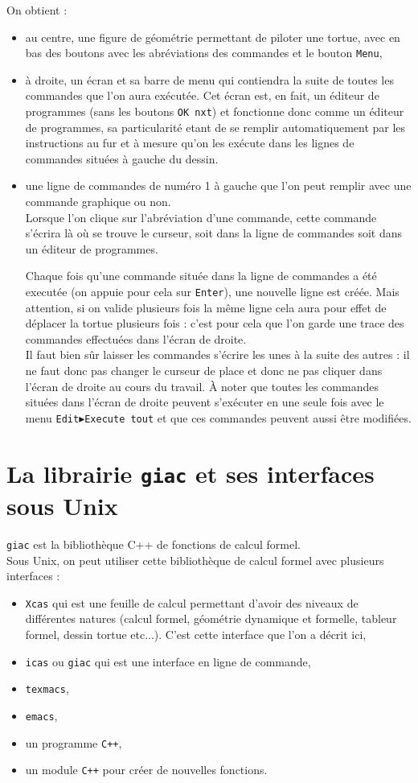 \documentclass[a4paper,11pt]{article}
\begin{document}
On obtient :
\begin{itemize}
\item au centre, une figure de g\'eom\'etrie permettant de piloter une tortue,
avec en bas des boutons avec les abr\'eviations des commandes et le 
bouton {\tt Menu}, 
\item \`a droite, un \'ecran et sa barre de menu qui contiendra la suite de 
toutes les commandes que l'on aura ex\'ecut\'ee. Cet \'ecran est, en fait, 
un \'editeur de programmes (sans les boutons {\tt OK nxt}) et fonctionne donc 
comme un \'editeur de programmes, sa particularit\'e etant de se remplir 
automatiquement par les instructions au fur et \`a mesure qu'on les ex\'ecute
dans les lignes de commandes situ\'ees \`a gauche du dessin.
\item une ligne de commandes de num\'ero 1 \`a gauche que l'on peut remplir
 avec une commande graphique ou non.\\
 Lorsque l'on clique sur l'abr\'eviation d'une commande, cette commande
s'\'ecrira l\`a o\`u se trouve le curseur, soit dans la ligne de commandes soit
dans un \'editeur de programmes. 

Chaque fois qu'une commande situ\'ee dans la ligne de commandes a \'et\'e 
execut\'ee (on appuie pour cela sur {\tt Enter}), une nouvelle ligne est 
cr\'e\'ee. Mais attention, si on valide plusieurs fois la m\^eme ligne cela 
aura pour effet de d\'eplacer la tortue plusieurs fois : c'est pour cela que 
l'on garde une trace des commandes effectu\'ees dans l'\'ecran de droite.\\
Il faut bien s\^ur laisser les commandes s'\'ecrire les unes \`a la suite des 
autres : il ne faut donc pas changer le curseur de place et donc ne pas cliquer
dans l'\'ecran de droite au cours du travail.
\`A noter que toutes les commandes situ\'ees dans l'\'ecran de droite peuvent
s'ex\'ecuter en une seule fois avec le menu 
{\tt Edit$\blacktriangleright$Execute tout} et que ces commandes peuvent aussi
\^etre modifi\'ees.
\end{itemize}
\section{La librairie {\tt giac} et ses interfaces sous Unix}
{\tt giac} est la biblioth\`eque C++ de fonctions de calcul formel.\\
Sous Unix, on peut utiliser cette biblioth\`eque de calcul formel avec 
plusieurs interfaces :
\begin{itemize}
\item 
{\tt Xcas} qui est une feuille de calcul permettant d'avoir des niveaux de 
diff\'erentes natures (calcul formel, g\'eom\'etrie dynamique et formelle, 
tableur formel, dessin tortue etc...). C'est cette interface que l'on a 
d\'ecrit ici,
\item {\tt icas} ou {\tt giac}  qui est une interface en ligne de commande,
\item {\tt texmacs},
\item {\tt emacs},
\item un programme {\tt C++},
\item un module {\tt C++} pour cr\'eer de nouvelles fonctions.
\end{itemize}
\end{document}

